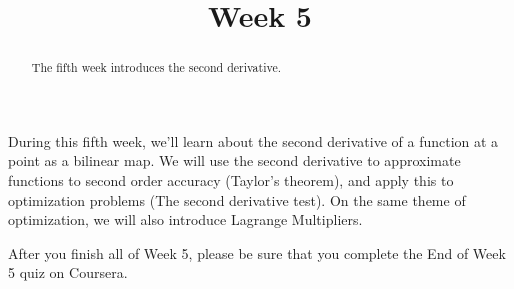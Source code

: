 \documentclass{ximera}
\title{Week 5}
\begin{document}
\begin{abstract}
  The fifth week introduces the second derivative.
\end{abstract}\maketitle

During this fifth week, we'll learn about the second derivative of a
function at a point as a bilinear map.  We will use the second
derivative to approximate functions to second order accuracy (Taylor's
theorem), and apply this to optimization problems (The second
derivative test).  On the same theme of optimization, we will also
introduce Lagrange Multipliers.

After you finish all of Week 5, please be sure that you complete the
End of Week 5 quiz on Coursera.
\end{document}
